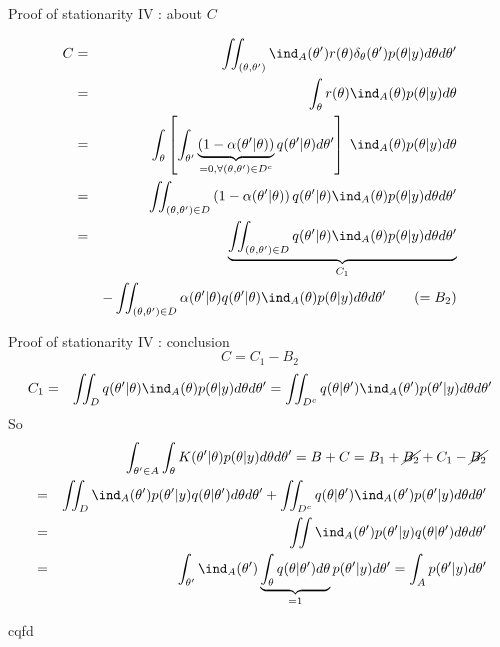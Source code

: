 \begin{frame}{Proof of stationarity IV : about $C$}


\begin{eqnarray*}
 C&=& \iint_{(\theta,\theta')}\ind_{A}(\theta') r(\theta) \delta_{\theta}(\theta') p(\theta| y) d\theta d\theta'\\
 &=& \int_{\theta}  r(\theta) \ind_{A}(\theta)p(\theta| y)  d\theta \\
 &=& \int_{\theta}  \left[ \int_{\theta'} \underbrace{\left(1-\alpha(\theta' | \theta)\right)}_{= 0,  \forall (\theta,\theta') \in D^c} q(\theta'|\theta) d\theta' \right] \; \ind_{A}(\theta)p(\theta| y)  d\theta\\ 
 &=& \iint_{(\theta,\theta') \in D} \left(1-\alpha(\theta' | \theta)\right)  q(\theta'|\theta)  \ind_{A}(\theta)p(\theta| y)  d\theta d\theta'\\
 &=& \underbrace{\iint_{(\theta,\theta') \in D}  q(\theta'|\theta)\ind_{A}(\theta)p(\theta| y)  d\theta d\theta' }_{C_1} \\
 && - \iint_{(\theta,\theta') \in D} \alpha(\theta' | \theta)   q(\theta'|\theta)\ind_{A}(\theta)p(\theta| y)  d\theta d\theta'  \quad  \quad (=B_2) 
\end{eqnarray*}

\end{frame}
\begin{frame}{Proof of stationarity IV : conclusion}
$$C = C_1 - B_2$$ 
\begin{eqnarray*}
C_1 &=& \iint_{ D}  q(\theta'|\theta)\ind_{A}(\theta)p(\theta| y)  d\theta d\theta' =   \iint_{D^c}  q(\theta|\theta')\ind_{A}(\theta')p(\theta'| y)  d\theta d\theta' 
\end{eqnarray*}
So 
{\small \begin{eqnarray*}
&& \int_{\theta' \in A}\int_{\theta} K(\theta' | \theta) p(\theta|y) d\theta d\theta' = B + C  = B_1 + \cancel{B_2} + C_1 - \cancel{B_2} \\
 &=& \iint_{  D }\ind_{A}(\theta')  p(\theta'| y)q(\theta|\theta') d\theta d\theta' +  \iint_{  D^c}  q(\theta|\theta')\ind_{A}(\theta')p(\theta'| y)  d\theta d\theta' \\
 &=& \iint \ind_{A}(\theta')  p(\theta'| y)q(\theta|\theta') d\theta d\theta'\\
 &=& \int_{\theta'} \ind_{A}(\theta') \underbrace{\int_{\theta} q(\theta|\theta')d\theta}_{=1}  p(\theta'| y)d\theta' = \int_A p(\theta'| y)d\theta'
 \end{eqnarray*}}
 \begin{flushright} 
cqfd
\end{flushright}
\end{frame}


